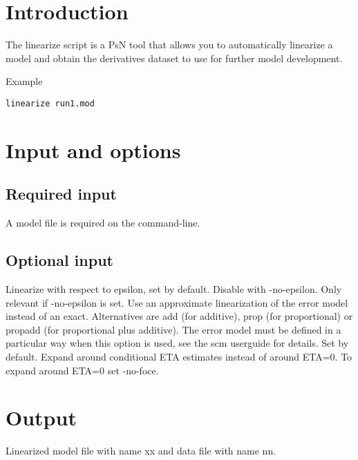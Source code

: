 



\maketitle


\section{Introduction}
The linearize script is a PsN tool that allows you to automatically linearize a model and obtain the derivatives dataset to use for further 
model development.

Example
\begin{verbatim}
linearize run1.mod
\end{verbatim}


\section{Input and options}
\subsection{Required input}
A model file is required on the command-line.

\subsection{Optional input}
\begin{optionlist}
Linearize with respect to epsilon, set by default. Disable with -no-epsilon.
\nextopt
{}
Only relevant if -no-epsilon is set. 
Use an approximate linearization of the error model instead of an exact.
Alternatives are add (for additive), prop (for proportional) or
propadd (for proportional plus additive).
The error model must be defined in a particular way when this option is used,
see the scm userguide for details.
\nextopt
{}
Set by default. Expand around conditional ETA estimates instead of around ETA=0. To expand around ETA=0 set -no-foce.
\nextopt
\end{optionlist}

\section{Output}
Linearized model file with name xx and data file with name nn.


